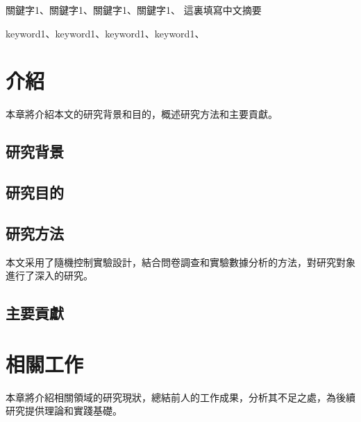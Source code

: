 \documentclass[
    writingLanguage=chinese,
    addPageTitle=yes,
    AddDeclaration=yes,
    addMUSTlog=no,
    refUnindent=yes,
    printing=no,
]{.def/must}
\begin{document}
\begin{abstract@cn}{關鍵字1、關鍵字1、關鍵字1、關鍵字1、}
這裏填寫中文摘要
\end{abstract@cn}

\begin{abstract@en}{keyword1、keyword1、keyword1、keyword1、}
\end{abstract@en}

\addtableofcontents

\section{介紹}

本章將介紹本文的研究背景和目的，概述研究方法和主要貢獻。

\subsection{研究背景}

\txtHere[1]

\subsection{研究目的}

\txtHere[2]

\subsection{研究方法}

本文采用了隨機控制實驗設計，結合問卷調查和實驗數據分析的方法，對研究對象進行了深入的研究。

\subsection{主要貢獻}

\txtHere[3]

\section{相關工作}

本章將介紹相關領域的研究現狀，總結前人的工作成果，分析其不足之處，為後續研究提供理論和實踐基礎。\citep{wangzhenwu2004, wenzaowai2009, qiuziheng2017, hedingzhao2019, qiujiongyou2014b, qiujiongyou9999, linjing2018, linwenyao2018, linxhui2014, chenyaning9999, luey2013, wendamao2015, qiujiongyou2014a, abdoh2019, bordwell2013, bourdieu1990, cole1992, harvey2007, johnson2018, macdonald2020, manguel2009b, milliot9999, poff2019, villazón2011, manguel2009a}
\end{document}

